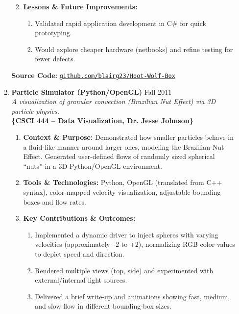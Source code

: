 \documentclass[oneside]{article}%
\begin{document}
\begin{enumerate}[]
\begin{enumerate}[]
\begin{enumerate}[-]
\begin{enumerate}[--]
						\end{enumerate}
					\item \textbf{Lessons \& Future Improvements:} 
						\begin{enumerate}[--]
							\item Validated rapid application development in C\# for quick prototyping. 
							\item Would explore cheaper hardware (netbooks) and refine testing for fewer defects.
						\end{enumerate}
				\end{enumerate}
				\vspace{3pt} %
				\textbf{Source Code:} \href{https://github.com/blairg23/Hoot-Wolf-Box}{\texttt{github.com/blairg23/Hoot-Wolf-Box}}\\

			\normalsize
			\item \textbf{Particle Simulator (Python/OpenGL)} \hfill Fall 2011\\
			\small
			\textit{A visualization of granular convection (Brazilian Nut Effect) via 3D particle physics.}\\
			\textbf{\{CSCI 444 -- Data Visualization, Dr. Jesse Johnson\}}
				\begin{enumerate}[-]
					\item \textbf{Context \& Purpose:} Demonstrated how smaller particles behave in a fluid-like manner around larger ones, modeling the Brazilian Nut Effect. Generated user-defined flows of randomly sized spherical “nuts” in a 3D Python/OpenGL environment.
					\item \textbf{Tools \& Technologies:} Python, OpenGL (translated from C++ syntax), color-mapped velocity visualization, adjustable bounding boxes and flow rates.		
					\item \textbf{Key Contributions \& Outcomes:}
						\begin{enumerate}[--]
							\item Implemented a dynamic driver to inject spheres with varying velocities (approximately --2 to +2), normalizing RGB color values to depict speed and direction.
							\item Rendered multiple views (top, side) and experimented with external/internal light sources.
							\item Delivered a brief write-up and animations showing fast, medium, and slow flow in different bounding-box sizes.
						\end{enumerate}
				

\end{enumerate}
\end{enumerate}
\end{enumerate}
\end{document}
